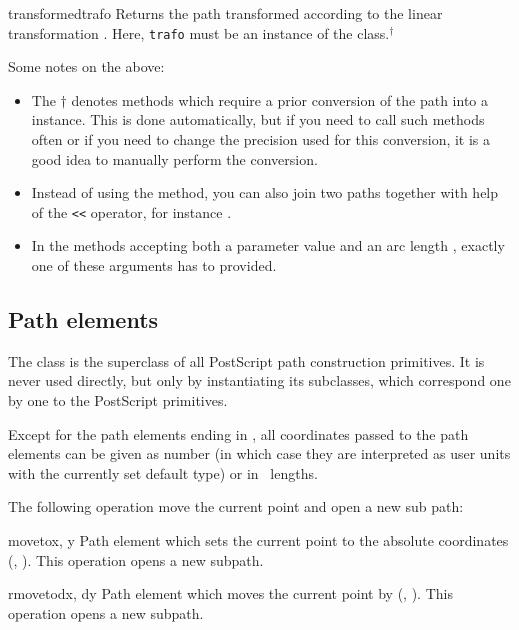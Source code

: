 \begin{methoddesc}{transformed}{trafo}
  Returns the path transformed according to the linear transformation
  . Here, \texttt{trafo} must be an instance of the
   class.$^\dagger$
\end{methoddesc}

Some notes on the above:
\begin{itemize}
\item The $\dagger$ denotes methods which require a prior
  conversion of the path into a  instance. This is
  done automatically, but if you need to call such methods often or
  if you need to change the precision used for this conversion, 
  it is a good idea to manually perform the conversion.
\item Instead of using the  method, you can also join two
paths together with help of the \verb|<<| operator, for instance
.
\item In the methods accepting both a parameter value  and
  an arc length , exactly one of these arguments has to
  provided.
\end{itemize}

\subsection{Path elements}

\label{path:pathel}

The class  is the superclass of all PostScript path
construction primitives. It is never used directly, but only by
instantiating its subclasses, which correspond one by one to the
PostScript primitives.

Except for the path elements ending in , all coordinates
passed to the path elements can be given as number (in which case they
are interpreted as user units with the currently set default type) or in
\PyX\ lengths.

The following operation move the current point and open a new sub path:

\begin{classdesc}{moveto}{x, y}
Path element which sets the current point to the absolute coordinates (,
). This operation opens a new subpath.
\end{classdesc}

\begin{classdesc}{rmoveto}{dx, dy}
Path element which moves the current point by (, ).
This operation opens a new subpath.
\end{classdesc}

